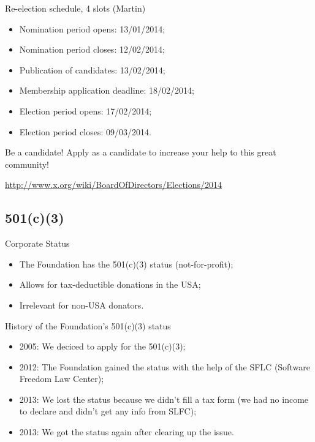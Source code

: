 \documentclass{beamer}
\begin{document}
		\begin{frame}
			\begin{block}{Re-election schedule, 4 slots (Martin)}
				\begin{itemize}
					\item Nomination period opens: 13/01/2014;
					\item Nomination period closes: 12/02/2014;
					\item Publication of candidates: 13/02/2014;
					\item Membership application deadline: 18/02/2014;
					\item Election period opens: 17/02/2014;
					\item Election period closes: 09/03/2014.
				\end{itemize}
			\end{block}

			\begin{block}{Be a candidate!}
				Apply as a candidate to increase your help to this great community!
			\end{block}

			\begin{block}{}
				\url{http://www.x.org/wiki/BoardOfDirectors/Elections/2014}
			\end{block}
		\end{frame}

		\subsection{501(c)(3)}
		\begin{frame}
			\begin{block}{Corporate Status}
				\begin{itemize}
					\item The Foundation has the 501(c)(3) status (not-for-profit);
					\item Allows for tax-deductible donations in the USA;
					\item Irrelevant for non-USA donators.
				\end{itemize}
			\end{block}

			\begin{block}{History of the Foundation's 501(c)(3) status}
				\begin{itemize}
					\item 2005: We deciced to apply for the 501(c)(3);
					\item 2012: The Foundation gained the status with the help
of the SFLC (Software Freedom Law Center);
					\item 2013: We lost the status because we didn't
fill a tax form (we had no income to declare and didn't get any info from SLFC);
					\item 2013: We got the status again after clearing up the issue.
				\end{itemize}
			\end{block}
		\end{frame}
\end{document}
